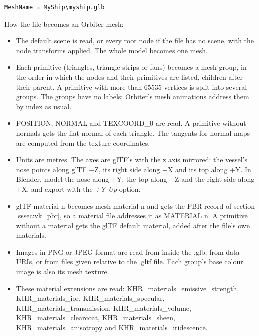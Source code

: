 \documentclass[Orbiter Developer Manual.tex]{subfiles}
\begin{document}
\begin{sloppypar}
\begin{lstlisting}[language=OSFS]
MeshName = MyShip\myship.glb
\end{lstlisting}

\noindent
How the file becomes an Orbiter mesh:

\begin{itemize}
\item The default scene is read, or every root node if the file has no scene, with the node transforms applied. The whole model becomes one mesh.
\item Each primitive (triangles, triangle strips or fans) becomes a mesh group, in the order in which the nodes and their primitives are listed, children after their parent. A primitive with more than 65535 vertices is split into several groups. The groups have no labels; Orbiter's mesh animations address them by index as usual.
\item POSITION, NORMAL and TEXCOORD\_0 are read. A primitive without normals gets the flat normal of each triangle. The tangents for normal maps are computed from the texture coordinates.
\item Units are metres. The axes are glTF's with the z axis mirrored: the vessel's nose points along glTF $-$Z, its right side along +X and its top along +Y. In Blender, model the nose along +Y, the top along +Z and the right side along +X, and export with the \textit{+Y Up} option.
\item glTF material n becomes mesh material n and gets the PBR record of section \ref{sssec:vk_pbr}, so a material file addresses it as MATERIAL n. A primitive without a material gets the glTF default material, added after the file's own materials.
\item Images in PNG or JPEG format are read from inside the .glb, from data URIs, or from files given relative to the .gltf file. Each group's base colour image is also its mesh texture.
\item {\raggedright These material extensions are read: KHR\_materials\_emissive\_strength, KHR\_materials\_ior, KHR\_materials\_specular, KHR\_materials\_transmission, KHR\_materials\_volume, KHR\_materials\_clearcoat, KHR\_materials\_sheen, KHR\_materials\_anisotropy and KHR\_materials\_iridescence.\par}
\end{itemize}


\end{sloppypar}
\end{document}
